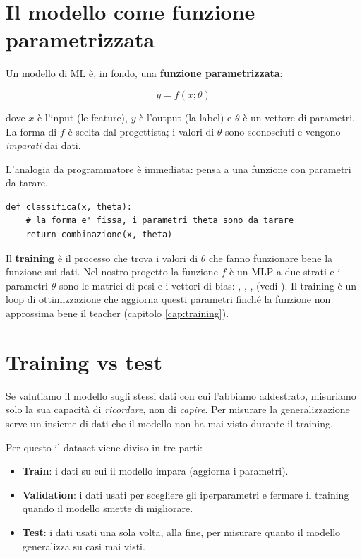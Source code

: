 \section{Il modello come funzione parametrizzata}\label{sec:modello-funzione-parametrizzata}

Un modello di ML è, in fondo, una \textbf{funzione parametrizzata}:

\begin{equation}
y = f(x; \theta)
\end{equation}

dove $x$ è l'input (le feature), $y$ è l'output (la label) e $\theta$ è un
vettore di parametri. La forma di $f$ è scelta dal progettista; i valori di
$\theta$ sono sconosciuti e vengono \emph{imparati} dai dati.

L'analogia da programmatore è immediata: pensa a una funzione con parametri
da tarare.

\begin{lstlisting}[caption={Una funzione parametrizzata in Python}]
def classifica(x, theta):
    # la forma e' fissa, i parametri theta sono da tarare
    return combinazione(x, theta)
\end{lstlisting}

Il \textbf{training} è il processo che trova i valori di $\theta$ che fanno
funzionare bene la funzione sui dati. Nel nostro progetto la funzione $f$ è
un MLP a due strati e i parametri $\theta$ sono le matrici di pesi e i
vettori di bias: , , ,  (vedi
). Il training è un loop di
ottimizzazione che aggiorna questi parametri finché la funzione non
approssima bene il teacher (capitolo \ref{cap:training}).

\section{Training vs test}\label{sec:training-test}

Se valutiamo il modello sugli stessi dati con cui l'abbiamo addestrato,
misuriamo solo la sua capacità di \emph{ricordare}, non di \emph{capire}. Per
misurare la generalizzazione serve un insieme di dati che il modello non ha
mai visto durante il training.

Per questo il dataset viene diviso in tre parti:

\begin{itemize}
  \item \textbf{Train}: i dati su cui il modello impara (aggiorna i
        parametri).
  \item \textbf{Validation}: i dati usati per scegliere gli iperparametri e
        fermare il training quando il modello smette di migliorare.
  \item \textbf{Test}: i dati usati una sola volta, alla fine, per misurare
        quanto il modello generalizza su casi mai visti.
\end{itemize}

